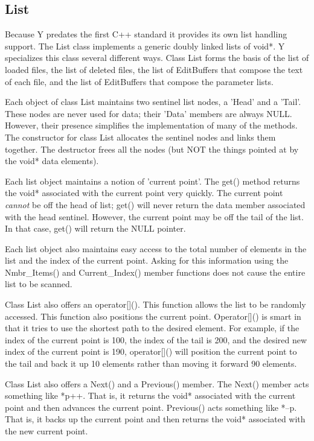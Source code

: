 \subsection{List}

Because Y predates the first C++ standard it provides its own list handling support. The List
class implements a generic doubly linked lists of void*. Y specializes this class several
different ways. Class List forms the basis of the list of loaded files, the list of deleted
files, the list of EditBuffers that compose the text of each file, and the list of EditBuffers
that compose the parameter lists.

Each object of class List maintains two sentinel list nodes, a 'Head' and a 'Tail'. These nodes
are never used for data; their 'Data' members are always NULL. However, their presence
simplifies the implementation of many of the methods. The constructor for class List allocates
the sentinel nodes and links them together. The destructor frees all the nodes (but NOT the
things pointed at by the void* data elements).

Each list object maintains a notion of 'current point'. The get() method returns the void*
associated with the current point very quickly. The current point \emph{cannot} be off the head
of list; get() will never return the data member associated with the head sentinel. However, the
current point may be off the tail of the list. In that case, get() will return the NULL pointer.

Each list object also maintains easy access to the total number of elements in the list and the
index of the current point. Asking for this information using the Nmbr\_Items() and
Current\_Index() member functions does not cause the entire list to be scanned.

Class List also offers an operator[](). This function allows the list to be randomly accessed.
This function also positions the current point. Operator[]() is smart in that it tries to use
the shortest path to the desired element. For example, if the index of the current point is 100,
the index of the tail is 200, and the desired new index of the current point is 190,
operator[]() will position the current point to the tail and back it up 10 elements rather than
moving it forward 90 elements.

Class List also offers a Next() and a Previous() member. The Next() member acts something like
*p++. That is, it returns the void* associated with the current point and then advances the
current point. Previous() acts something like *--p. That is, it backs up the current point and
then returns the void* associated with the new current point.

